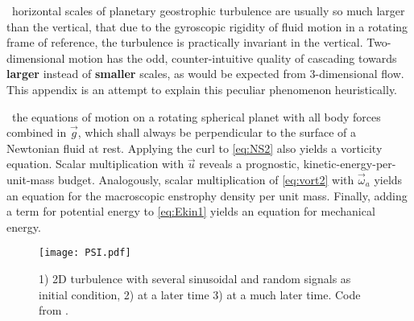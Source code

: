 \label{chap:turbu_categories}
~horizontal scales of planetary geostrophic turbulence are usually so much
larger than the vertical, that due to the gyroscopic rigidity of fluid motion
in a rotating frame of reference, the turbulence is practically invariant in
the vertical. Two-dimensional motion has the odd, counter-intuitive quality of
cascading towards \textbf{larger} instead of \textbf{smaller} scales, as would be
expected from 3-dimensional flow. This appendix is an attempt to explain
this peculiar phenomenon heuristically.


~the equations of motion on a rotating spherical planet with all body forces
combined in $\vec{g}$, which shall always be perpendicular to
the surface of a Newtonian fluid at rest. Applying the curl to \eqref{eq:NS2}
also yields a vorticity equation.
Scalar multiplication with $\vec{u}$ reveals a prognostic, kinetic-energy-per-unit-mass budget.
Analogously, scalar multiplication of \eqref{eq:vort2} with $\vec{\omega}_{a}$ yields an equation
for the macroscopic enstrophy density per unit mass. Finally, adding a term for potential energy to \eqref{eq:Ekin1} yields an equation for mechanical energy.

\begin{figure}
\texttt{[image: PSI.pdf]}
\caption{1) 2D turbulence with several sinusoidal and random signals as initial condition, 2) at a later time 3) at a much later time. Code from
\citet{Seibold2008a}.}
\label{fig:PSI}
\end{figure}


